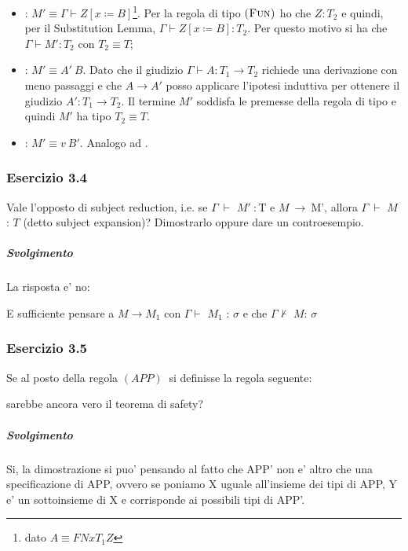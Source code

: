 \begin{description}
  \begin{itemize}
    \item {}: $M' \equiv{} \Gamma \vdash{}
      Z[x \coloneqq{} B]$\footnote{dato $A \equiv{} FN{x}{T_1}Z$}.
      Per la regola di tipo $\myrule{Fun}$ ho che $Z : T_2$ e quindi, per
       il Substitution Lemma, $\Gamma \vdash{} Z[x \coloneqq{} B] : T_2$. Per
      questo motivo si ha che $\Gamma \vdash{} M' : T_2$ con $T_2 \equiv T$;
    \item {}: $M' \equiv{} A'\: B$. Dato che il giudizio $\Gamma \vdash A : T_1 \to T_2$ richiede una derivazione con meno passaggi e che $A \to A'$ posso applicare l'ipotesi induttiva per ottenere il giudizio $A' : T_1 \to T_2$. Il termine $M'$ soddisfa le premesse della regola di tipo  e quindi $M'$ ha tipo $T_2 \equiv T$.

    \item {}: $M' \equiv{} v\: B'$. Analogo ad .
  \end{itemize}

 
\end{description}




\subsubsection*{Esercizio 3.4}

Vale l'opposto di subject reduction, i.e. se $\Gamma\:\vdash$ $M'\: :  $T e $M\:\rightarrow\:$M', allora $\Gamma\:\vdash$ $M$ : $T$ (detto subject expansion)? Dimostrarlo oppure dare un controesempio.
\subparagraph*{Svolgimento}
La risposta e' no:

E sufficiente pensare a $M \rightarrow M_1$ con $\Gamma\vdash$ $M_1$ : $\sigma$ e che 
$\Gamma\nvdash$ $M$: $\sigma$

\subsubsection*{Esercizio 3.5}
Se al posto della regola $(APP)\:$ si definisse la regola seguente:

\begin{prooftree} 
	
\end{prooftree} 

sarebbe ancora vero il teorema di safety?
\subparagraph*{Svolgimento}
Si, la dimostrazione si puo' pensando al fatto che APP' non e' altro che una specificazione di APP, ovvero se poniamo X uguale all'insieme dei tipi di APP, Y e' un sottoinsieme di X e corrisponde ai possibili tipi di APP'.

